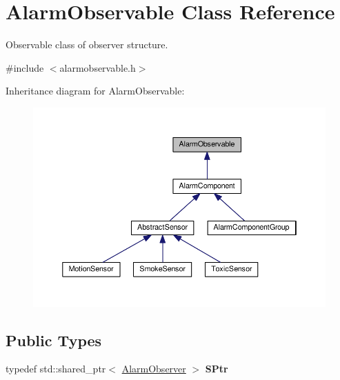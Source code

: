 \hypertarget{classAlarmObservable}{}\section{Alarm\+Observable Class Reference}
\label{classAlarmObservable}


Observable class of observer structure.  




{\ttfamily \#include $<$alarmobservable.\+h$>$}



Inheritance diagram for Alarm\+Observable\+:\nopagebreak
\begin{figure}[H]
\begin{center}
\leavevmode
\includegraphics[width=350pt]{classAlarmObservable__inherit__graph}
\end{center}
\end{figure}
\subsection*{Public Types}
\begin{DoxyCompactItemize}
\item 
typedef std\+::shared\+\_\+ptr$<$ \hyperlink{classAlarmObserver}{Alarm\+Observer} $>$ {\bfseries S\+Ptr}\hypertarget{classAlarmObservable_a12ddadb3633a785fa4f79378b2b46878}{}\label{classAlarmObservable_a12ddadb3633a785fa4f79378b2b46878}

\end{DoxyCompactItemize}
